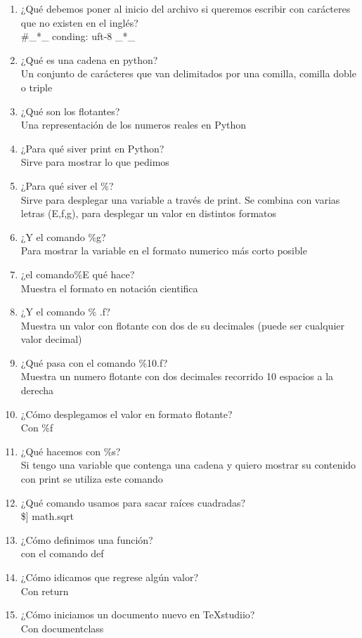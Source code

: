 \documentclass[letterpaper, 12pt, oneside]{article}%
\begin{document}
\begin{enumerate}
\item ¿Qué debemos poner al inicio del archivo si queremos escribir con carácteres que no existen en el inglés?\\
\#\_*\_ conding: uft-8 \_*\_
\item ¿Qué es una cadena en python?\\
Un conjunto de carácteres que van delimitados por una comilla, comilla doble o triple
\item ¿Qué son los flotantes?\\
Una representación de los numeros reales en Python
\item  ¿Para qué siver print en Python?\\ 
Sirve para mostrar lo que pedimos
\item ¿Para qué siver el \%?\\ 
Sirve para desplegar una variable a través de print. Se combina con varias letras (E,f,g), para desplegar un valor en distintos formatos
\item ¿Y el comando \%g?\\ 
Para mostrar la variable en el formato numerico más corto posible
\item ¿el comando\%E qué hace?\\ 
Muestra el formato en notación cientifica
\item ¿Y el comando \% .f?\\
 Muestra un valor con flotante con dos de su decimales (puede ser cualquier valor decimal)
\item ¿Qué pasa con el comando \%10.f?\\ 
Muestra un numero flotante con dos decimales recorrido 10 espacios a la derecha
\item ¿Cómo desplegamos el valor en formato flotante?\\
Con \%f
\item ¿Qué hacemos con \%s?\\
Si tengo una variable que contenga una cadena y quiero mostrar su contenido con print se utiliza este comando
\item ¿Qué comando usamos para sacar raíces cuadradas?\\
 \$] math.sqrt
\item  ¿Cómo definimos una función?\\
con el comando def
\item ¿Cómo idicamos que regrese algún valor? \\
Con return  
\item ¿Cómo iniciamos un documento nuevo en TeXstudiio? \\ Con documentclass

\end{enumerate}
\end{document}
